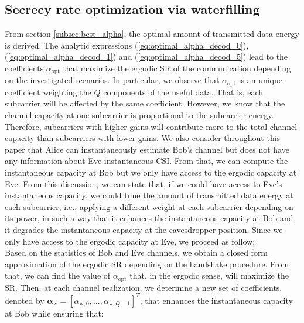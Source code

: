 \documentclass[journal,comsoc]{IEEEtran}
\begin{document}
\subsection{Secrecy rate optimization via waterfilling}
\label{subsec:perf_waterf}
From section \ref{subsec:best_alpha}, the optimal amount of transmitted data energy is derived. The analytic expressions (\ref{eq:optimal_alpha_decod_0}), (\ref{eq:optimal_alpha_decod_1}) and (\ref{eq:optimal_alpha_decod_5}) lead to the coefficients $\alpha_{\text{opt}}$ that maximize the ergodic SR of the communication depending on the investigated scenarios.
In particular, we observe that $\alpha_{\text{opt}}$ is an unique coefficient weighting the $Q$ components of the useful data. That is, each subcarrier will be affected by the same coefficient. However, we know that the channel capacity at one subcarrier is proportional to the subcarrier energy. Therefore, subcarriers with higher gains will contribute more to the total channel capacity than subcarriers with lower gains. We also consider throughout this paper that Alice can instantaneously estimate Bob's channel but does not have any information about Eve instantaneous CSI. From that, we can compute the instantaneous capacity at Bob but we only have access to the ergodic capacity at Eve. From this discussion, we can state that, if we could have access to Eve's instantaneous capacity, we could tune the amount of transmitted data energy at each subcarrier, i.e., applying a different weight at each subcarrier depending on its power, in such a way that it enhances the instantaneous capacity at Bob and it degrades the instantaneous capacity at the eavesdropper position. Since we only have access to the ergodic capacity at Eve, we proceed as follow:\\
Based on the statistics of Bob and Eve channels, we obtain a closed form approximation of the ergodic SR depending on the handshake procedure. From that, we can find  the value of $\alpha_{\text{opt}}$ that, in the ergodic sense, will maximize the SR. Then, at each channel realization, we determine a new set of coefficients, denoted by $\boldsymbol\alpha_{\text{w}} = [\alpha_{\text{w},0},...,\alpha_{\text{w},Q-1}]^T $, that enhances the instantaneous capacity at Bob while ensuring that:
\end{document}
